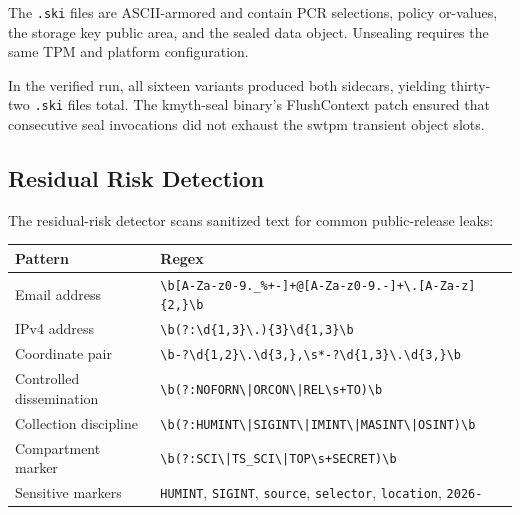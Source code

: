 \documentclass[
]{article}
\newcounter{none} %
\begin{document}
The \texttt{.ski} files are ASCII-armored and contain PCR selections,
policy or-values, the storage key public area, and the sealed data
object. Unsealing requires the same TPM and platform configuration.

In the verified run, all sixteen variants produced both sidecars,
yielding thirty-two \texttt{.ski} files total. The kmyth-seal binary's
FlushContext patch ensured that consecutive seal invocations did not
exhaust the swtpm transient object slots.

\subsection{Residual Risk Detection}\label{residual-risk-detection}

The residual-risk detector scans sanitized text for common
public-release leaks:

{\def\LTcaptype{none} %
\begin{longtable}[]{@{}
  >{\raggedright\arraybackslash}p{}
  >{\raggedright\arraybackslash}p{}@{}}
\toprule\noalign{}
\begin{minipage}[b]{\linewidth}\raggedright
Pattern
\end{minipage} & \begin{minipage}[b]{\linewidth}\raggedright
Regex
\end{minipage} \\
\midrule\noalign{}
\endhead
\bottomrule\noalign{}
\endlastfoot
Email address &
\texttt{\textbackslash{}b{[}A-Za-z0-9.\_\%+-{]}+@{[}A-Za-z0-9.-{]}+\textbackslash{}.{[}A-Za-z{]}\{2,\}\textbackslash{}b} \\
IPv4 address &
\texttt{\textbackslash{}b(?:\textbackslash{}d\{1,3\}\textbackslash{}.)\{3\}\textbackslash{}d\{1,3\}\textbackslash{}b} \\
Coordinate pair &
\texttt{\textbackslash{}b-?\textbackslash{}d\{1,2\}\textbackslash{}.\textbackslash{}d\{3,\},\textbackslash{}s*-?\textbackslash{}d\{1,3\}\textbackslash{}.\textbackslash{}d\{3,\}\textbackslash{}b} \\
Controlled dissemination &
\texttt{\textbackslash{}b(?:NOFORN\textbackslash{}|{}ORCON\textbackslash{}|{}REL\textbackslash{}s+TO)\textbackslash{}b} \\
Collection discipline &
\texttt{\textbackslash{}b(?:HUMINT\textbackslash{}|{}SIGINT\textbackslash{}|{}IMINT\textbackslash{}|{}MASINT\textbackslash{}|{}OSINT)\textbackslash{}b} \\
Compartment marker &
\texttt{\textbackslash{}b(?:SCI\textbackslash{}|{}TS\_SCI\textbackslash{}|{}TOP\textbackslash{}s+SECRET)\textbackslash{}b} \\
Sensitive markers & \texttt{HUMINT}, \texttt{SIGINT}, \texttt{source},
\texttt{selector}, \texttt{location}, \texttt{2026-} \\
\end{longtable}
}
\end{document}
